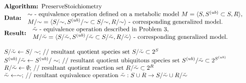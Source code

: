 \documentclass[9pt]{article}
\newcounter{def}
\begin{document}
\[ \begin{array}{l}
\mbox{\textbf{Algorithm: }PreserveStoichiometry}\\
\mbox{\textbf{Data: }} \begin{array}{l} \mbox{${\sim}$ - equivalence operation defined on a metabolic model $M=\langle S, S^{(ub)}\subset{S}, R \rangle$,}\\ \mbox{$M/{\sim} = \langle S/{\sim}, S^{(ub)}/{\sim} \subset S/{\sim}, R/{\sim} \rangle$ - corresponding generalized model.} 
\end{array}\\
\mbox{\textbf{Result: }} \begin{array}{l} \mbox{$\breve{\sim}$ - equivalence operation described in Problem~3,}\\  \mbox{$M/\breve{\sim} = \langle S/\breve{\sim}, S^{(ub)}/\breve{\sim} \subset S/\breve{\sim}, R/\breve{\sim} \rangle$ - corresponding generalized model.} \end{array}\\
\mbox{~}\\
\mbox{$S/\breve{\sim} \leftarrow S/\sim;$ // resultant quotient species set $ S/{\breve{\sim}}\subset 2^S$}\\
\mbox{$S^{(ub)}/\breve{\sim} \leftarrow S^{(ub)}/\sim;$ // resultant quotient ubiquitous species set $ S^{(ub)}/{\breve{\sim}}\subset 2^{S^{(ub)}}$}\\
\mbox{$R/\breve{\sim} \leftarrow \emptyset;$ // resultant quotient reaction set $ R/{\breve{\sim}}\subset 2^R$}\\
\mbox{$\breve{\sim} \leftarrow \sim;$ // resultant equivalence operation $ {\breve{\sim}}: S\cup{R} \rightarrow S/{\breve{\sim}}\cup{R/{\breve{\sim}}}$}\\
\mbox{~}\\


\end{array}\]
\end{document}
